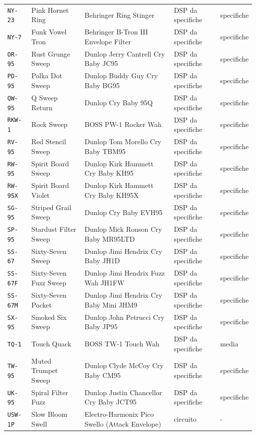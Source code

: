 \begin{xltabular}{\linewidth}{@{}l l X l l@{}}
\texttt{NY-23} & Pink Hornet Ring & Behringer Ring Stinger & DSP da specifiche & specifiche\\
\texttt{NY-7} & Funk Vowel Tron & Behringer B-Tron III Envelope Filter & DSP da specifiche & specifiche\\
\texttt{OR-95} & Rust Grunge Sweep & Dunlop Jerry Cantrell Cry Baby JC95 & DSP da specifiche & specifiche\\
\texttt{PD-95} & Polka Dot Sweep & Dunlop Buddy Guy Cry Baby BG95 & DSP da specifiche & specifiche\\
\texttt{QW-95} & Q Sweep Return & Dunlop Cry Baby 95Q & DSP da specifiche & specifiche\\
\texttt{RKW-1} & Rock Sweep & BOSS PW-1 Rocker Wah & DSP da specifiche & specifiche\\
\texttt{RV-95} & Red Stencil Sweep & Dunlop Tom Morello Cry Baby TBM95 & DSP da specifiche & specifiche\\
\texttt{RW-95} & Spirit Board Sweep & Dunlop Kirk Hammett Cry Baby KH95 & DSP da specifiche & specifiche\\
\texttt{RW-95X} & Spirit Board Violet & Dunlop Kirk Hammett Cry Baby KH95X & DSP da specifiche & specifiche\\
\texttt{SG-95} & Striped Grail Sweep & Dunlop Cry Baby EVH95 & DSP da specifiche & specifiche\\
\texttt{SP-95} & Stardust Filter Sweep & Dunlop Mick Ronson Cry Baby MR95LTD & DSP da specifiche & specifiche\\
\texttt{SS-67} & Sixty-Seven Sweep & Dunlop Jimi Hendrix Cry Baby JH1D & DSP da specifiche & specifiche\\
\texttt{SS-67F} & Sixty-Seven Fuzz Sweep & Dunlop Jimi Hendrix Fuzz Wah JH1FW & DSP da specifiche & specifiche\\
\texttt{SS-67M} & Sixty-Seven Pocket & Dunlop Jimi Hendrix Cry Baby Mini JHM9 & DSP da specifiche & specifiche\\
\texttt{SX-95} & Smoked Six Sweep & Dunlop John Petrucci Cry Baby JP95 & DSP da specifiche & specifiche\\
\texttt{TQ-1} & Touch Quack & BOSS TW-1 Touch Wah & DSP da specifiche & media\\
\texttt{TW-95} & Muted Trumpet Sweep & Dunlop Clyde McCoy Cry Baby CM95 & DSP da specifiche & specifiche\\
\texttt{UK-95} & Spiral Filter Fuzz & Dunlop Justin Chancellor Cry Baby JCT95 & DSP da specifiche & specifiche\\
\texttt{USW-1P} & Slow Bloom Swell & Electro-Harmonix Pico Swello (Attack Envelope) & circuito & -\\

\end{xltabular}
